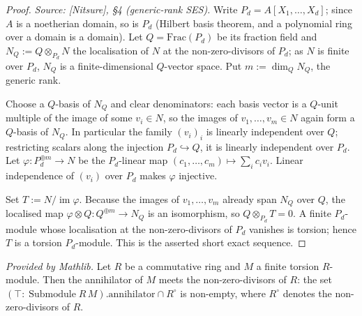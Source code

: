 \begin{proof}

\leanok
  \textit{Source: [Nitsure], \S4 (generic-rank SES).}
  Write \(P_d = A[X_1, \dots, X_d]\); since \(A\) is a noetherian domain, so is \(P_d\)
  (Hilbert basis theorem, and a polynomial ring over a domain is a domain). Let
  \(Q = \mathrm{Frac}(P_d)\) be its fraction field and
  \(N_Q := Q \otimes_{P_d} N\) the localisation of \(N\) at the non-zero-divisors of
  \(P_d\); as \(N\) is finite over \(P_d\), \(N_Q\) is a finite-dimensional
  \(Q\)-vector space. Put \(m := \dim_Q N_Q\), the generic rank.

  Choose a \(Q\)-basis of \(N_Q\) and clear denominators: each basis vector is a
  \(Q\)-unit multiple of the image of some \(v_i \in N\), so the images of
  \(v_1, \dots, v_m \in N\) again form a \(Q\)-basis of \(N_Q\). In particular the family
  \((v_i)_{i}\) is linearly independent over \(Q\); restricting scalars along the
  injection \(P_d \hookrightarrow Q\), it is linearly independent over \(P_d\). Let
  \(\varphi : P_d^{\oplus m} \to N\) be the \(P_d\)-linear map
  \((c_1, \dots, c_m) \mapsto \sum_i c_i v_i\). Linear independence of \((v_i)\) over
  \(P_d\) makes \(\varphi\) injective.

  Set \(T := N / \operatorname{im}\varphi\). Because the images of \(v_1, \dots, v_m\)
  already span \(N_Q\) over \(Q\), the localised map \(\varphi \otimes Q : Q^{\oplus m}
  \to N_Q\) is an isomorphism, so \(Q \otimes_{P_d} T = 0\). A finite \(P_d\)-module whose
  localisation at the non-zero-divisors of \(P_d\) vanishes is torsion; hence \(T\) is a
  torsion \(P_d\)-module. This is the asserted short exact sequence.
\end{proof}

\begin{lemma}
  \label{lem:annihilator_meets_nonZeroDivisors}
  \mathlibok
  \textit{Provided by Mathlib.}
  Let \(R\) be a commutative ring and \(M\) a finite torsion \(R\)-module. Then the
  annihilator of \(M\) meets the non-zero-divisors of \(R\): the set
  \((\top : \operatorname{Submodule} R\,M).\mathrm{annihilator} \cap R^{\circ}\) is
  non-empty, where \(R^{\circ}\) denotes the non-zero-divisors of \(R\).
\end{lemma}

